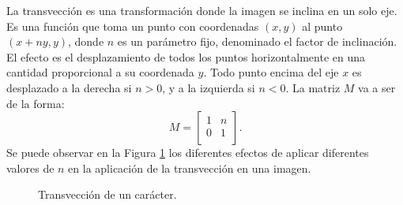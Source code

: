 			La transvección es una transformación donde la imagen se inclina en un solo eje. Es una función que toma un punto con coordenadas $(x,y)$ al punto $(x +ny, y)$, donde $n$ es un parámetro fijo, denominado el factor de inclinación. El efecto es el desplazamiento de todos los puntos horizontalmente en una cantidad proporcional a su coordenada $y$. Todo punto encima del eje $x$ es desplazado a la derecha si $n > 0$, y a la izquierda si $n < 0$. La matriz $M$ va a ser de la forma:
			\begin{equation}
				M = 
				\begin{bmatrix}
					1 & n \\
					0 & 1 \\
				\end{bmatrix}.
			\end{equation}
		Se puede observar en la Figura \ref{fig: Transformacion Afin - Transveccion} los diferentes efectos de aplicar diferentes valores de $n$ en la aplicación de la transvección en una imagen.
		\begin{figure}[htbp]
			\centering
			\caption[Transvección de un carácter]{Transvección de un carácter.}
			\label{fig: Transformacion Afin - Transveccion}
		\end{figure}	
		
